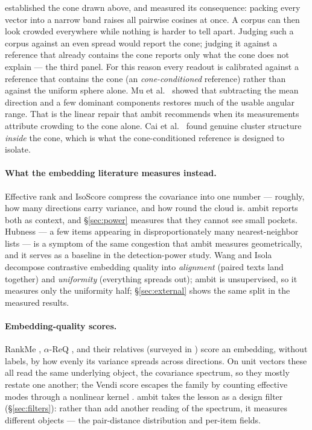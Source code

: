 \documentclass[11pt,letterpaper]{article}
\begin{document}
established the cone drawn above, and measured its consequence: packing
every vector into a narrow band raises all pairwise cosines at once. A
corpus can then look crowded everywhere while nothing is harder to tell
apart. Judging such a corpus against an even spread would report the cone;
judging it against a reference that already contains the cone reports only
what the cone does not explain --- the third panel. For this reason every
readout is calibrated against a reference that contains the cone (an
\emph{cone-conditioned} reference) rather than against the uniform
sphere alone. Mu et al.\ \cite{mu2018} showed that subtracting the mean
direction and a few dominant components restores much of the usable
angular range. That is the linear repair that \textsf{ambit} recommends
when its measurements attribute crowding to the cone alone. Cai et al.\
\cite{cai2021} found genuine cluster structure \emph{inside} the cone,
which is what the cone-conditioned reference is designed to isolate.

\paragraph{What the embedding literature measures instead.}
Effective rank \cite{roy2007} and IsoScore \cite{rudman2022} compress the
covariance into one number --- roughly, how many directions carry
variance, and how round the cloud is. \textsf{ambit} reports both as
context, and \S\ref{sec:power} measures that they cannot see small
pockets. Hubness \cite{radovanovic2010} --- a few items appearing in
disproportionately many nearest-neighbor lists --- is a symptom of the
same congestion that \textsf{ambit} measures geometrically, and it serves
as a baseline in the detection-power study. Wang and Isola \cite{wang2020}
decompose contrastive embedding quality into \emph{alignment} (paired
texts land together) and \emph{uniformity} (everything spreads out);
\textsf{ambit} is unsupervised, so it measures only the uniformity half;
\S\ref{sec:external} shows the same split in the measured results.

\paragraph{Embedding-quality scores.}
RankMe \cite{garrido2023}, $\alpha$-ReQ \cite{agrawal2022}, and their
relatives (surveyed in \cite{tsitsulin2023}) score an embedding, without
labels, by how evenly its variance spreads across directions. On unit
vectors these all read the same underlying object, the covariance
spectrum, so they mostly restate one another; the Vendi score
\cite{friedman2023,pasarkar2024} escapes the family by counting effective
modes through a nonlinear kernel \cite{giraldo2015,ospanov2024}.
\textsf{ambit} takes the lesson as a design filter (\S\ref{sec:filters}):
rather than add another reading of the spectrum, it measures different
objects --- the pair-distance distribution and per-item fields.
\end{document}
